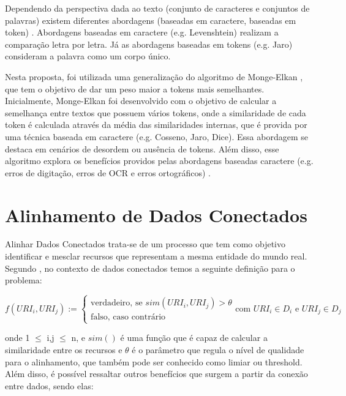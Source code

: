 Dependendo da perspectiva dada ao texto (conjunto de caracteres e conjuntos de palavras) existem diferentes abordagens (baseadas em caractere, baseadas em token) \cite{cohen2003comparison}. Abordagens baseadas em caractere (e.g. Levenshtein) realizam a comparação letra por letra. Já as abordagens baseadas em tokens (e.g. Jaro)  consideram a palavra como um corpo único.

Nesta proposta, foi utilizada uma generalização do algoritmo de Monge-Elkan \cite{monge1996field}, que tem o objetivo de dar um peso maior a tokens mais semelhantes. Inicialmente, Monge-Elkan foi desenvolvido com o objetivo de calcular a semelhança entre textos que possuem vários tokens, onde a similaridade de cada token é calculada através da média das similaridades internas, que é provida por uma técnica baseada em caractere (e.g. Cosseno, Jaro, Dice). Essa abordagem se destaca em cenários de desordem ou ausência de tokens. Além disso, esse algoritmo explora os benefícios providos pelas abordagens baseadas caractere (e.g. erros de digitação, erros de OCR e erros ortográficos) \cite{jimenez2009generalized}.

\section{Alinhamento de Dados Conectados}

Alinhar Dados Conectados  trata-se de um processo que tem como objetivo identificar e mesclar recursos que representam a mesma entidade do mundo real. Segundo , no contexto de dados conectados temos a seguinte definição para o problema:

\begin{equation}
f\left( { URI }_{ i },{ URI }_{ j } \right) :=\begin{cases} \mbox{verdadeiro, se } sim\left( { URI }_{ i },{ URI }_{ j } \right) >\theta  \\ \mbox{falso, caso contrário} \end{cases}\mbox{com }{ URI }_{ i } \in { D }_{ i }\mbox{ e }{ URI }_{ j } \in { D }_{ j }
\end{equation}

onde 1 $\leq$ i,j $\leq$ n, e $sim()$ é uma função que é capaz de calcular a similaridade entre os recursos e $\theta$ é o parâmetro que regula o nível de qualidade para o alinhamento, que também pode ser conhecido como limiar ou threshold. Além disso, é possível ressaltar outros benefícios que surgem a partir da conexão entre dados, sendo elas: 

